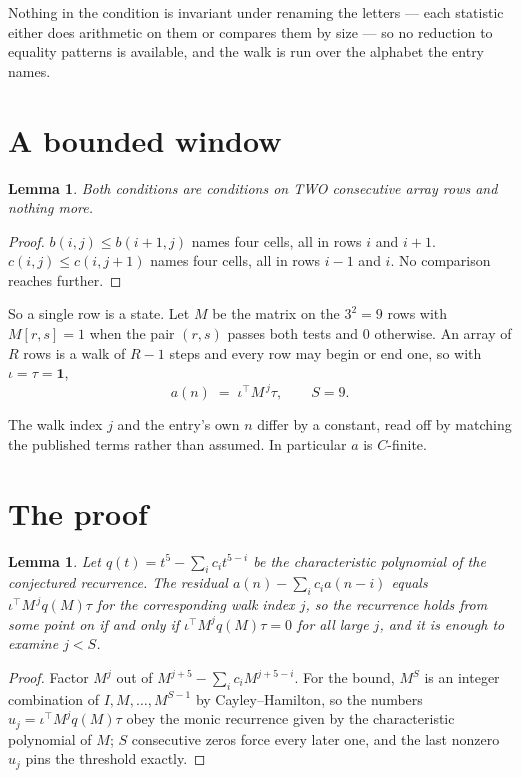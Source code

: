 \documentclass[11pt,a4paper]{article}
\theoremstyle{plain}
\newtheorem{lemma}[theorem]{Lemma}
\theoremstyle{definition}
\begin{document}
Nothing in the condition is invariant under renaming the letters --- each statistic either does
arithmetic on them or compares them by size --- so no reduction to equality patterns is
available, and the walk is run over the alphabet the entry names.

\section{A bounded window}

\begin{lemma}\label{lem:win}
Both conditions are conditions on TWO consecutive array rows and nothing more.
\end{lemma}

\begin{proof}
$b(i,j)\le b(i{+}1,j)$ names four cells, all in rows $i$ and $i+1$. $c(i,j)\le c(i,j{+}1)$
names four cells, all in rows $i-1$ and $i$. No comparison reaches further.
\end{proof}

So a single row is a state. Let $M$ be the matrix on the $3^{2}=9$ rows with
$M[r,s]=1$ when the pair $(r,s)$ passes both tests and $0$ otherwise. An array of $R$ rows is a
walk of $R-1$ steps and every row may begin or end one, so with $\iota=\tau=\mathbf{1}$,
\[
a(n)\;=\;\iota^{\!\top}M^{\,j}\tau ,\qquad S=9.
\]

The walk index $j$ and the entry's own $n$ differ by a constant, read off by matching the
published terms rather than assumed. In particular $a$ is $C$-finite.

\section{The proof}

\begin{lemma}\label{lem:crit}
Let $q(t)=t^{5}-\sum_i c_it^{5-i}$ be the characteristic polynomial of the
conjectured recurrence. The residual $a(n)-\sum_ic_ia(n-i)$ equals
$\iota^{\!\top}M^{\,j}q(M)\tau$ for the corresponding walk index $j$, so the recurrence
holds from some point on if and only if $\iota^{\!\top}M^{j}q(M)\tau=0$ for all large $j$,
and it is enough to examine $j<S$.
\end{lemma}

\begin{proof}
Factor $M^{j}$ out of $M^{j+5}-\sum_ic_iM^{j+5-i}$. For the bound, $M^{S}$
is an integer combination of $I,M,\dots,M^{S-1}$ by Cayley--Hamilton, so the numbers
$u_j=\iota^{\!\top}M^{j}q(M)\tau$ obey the monic recurrence given by the characteristic
polynomial of $M$; $S$ consecutive zeros force every later one, and the last nonzero $u_j$
pins the threshold exactly.
\end{proof}
\end{document}
